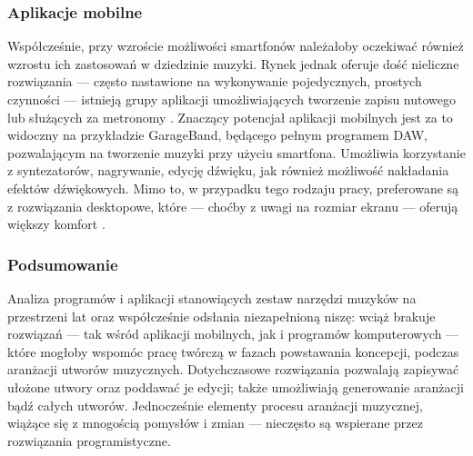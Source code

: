 \subsubsection{Aplikacje mobilne}
Współcześnie, przy wzroście możliwości smartfonów należałoby oczekiwać również wzrostu ich zastosowań w dziedzinie
muzyki. Rynek jednak oferuje dość nieliczne rozwiązania — często nastawione na wykonywanie pojedycznych,
prostych czynności — istnieją grupy aplikacji umożliwiających tworzenie zapisu nutowego lub służących za metronomy \cite{10}.
Znaczący potencjał aplikacji mobilnych jest za to widoczny na przykładzie GarageBand, będącego pełnym programem DAW,
pozwalającym na tworzenie muzyki przy użyciu smartfona. Umożliwia korzystanie z syntezatorów, nagrywanie, edycję dźwięku,
jak również możliwość nakładania efektów dźwiękowych. Mimo to, w przypadku tego rodzaju pracy, preferowane są
z rozwiązania desktopowe, które — choćby z uwagi na rozmiar ekranu — oferują większy komfort \cite{interaction}.

\subsubsection{Podsumowanie}
Analiza programów i aplikacji stanowiących zestaw narzędzi muzyków na przestrzeni lat oraz współcześnie
odsłania niezapełnioną niszę: wciąż brakuje rozwiązań — tak wśród aplikacji mobilnych, jak i programów komputerowych —
które mogłoby wspomóc pracę twórczą w fazach powstawania koncepcji, podczas aranżacji utworów muzycznych. Dotychczasowe
rozwiązania pozwalają zapisywać ułożone utwory oraz poddawać je edycji; także umożliwiają generowanie aranżacji bądź całych
utworów. Jednocześnie elementy procesu aranżacji muzycznej, wiążące się z mnogością pomysłów i zmian —
nieczęsto są wspierane przez rozwiązania programistyczne.

